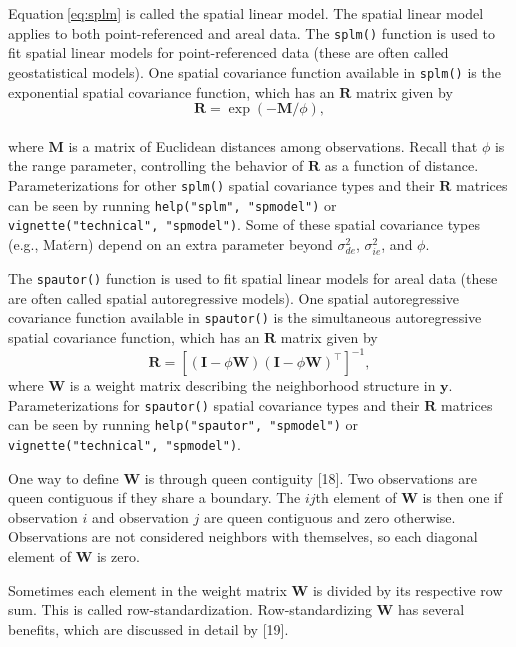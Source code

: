 \documentclass[10pt,letterpaper]{article}
\begin{document}
Equation\(~\)\ref{eq:splm} is called the spatial linear model. The
spatial linear model applies to both point-referenced and areal data.
The \texttt{splm()} function is used to fit spatial linear models for
point-referenced data (these are often called geostatistical models).
One spatial covariance function available in \texttt{splm()} is the
exponential spatial covariance function, which has an \(\mathbf{R}\)
matrix given by \begin{equation*}
  \mathbf{R} = \exp(-\mathbf{M} / \phi),
\end{equation*}\\
where \(\mathbf{M}\) is a matrix of Euclidean distances among
observations. Recall that \(\phi\) is the range parameter, controlling
the behavior of \(\mathbf{R}\) as a function of distance.
Parameterizations for other \texttt{splm()} spatial covariance types and
their \(\mathbf{R}\) matrices can be seen by running
\texttt{help("splm",\ "spmodel")} or
\texttt{vignette("technical",\ "spmodel")}. Some of these spatial
covariance types (e.g., Mat\(\acute{e}\)rn) depend on an extra parameter
beyond \(\sigma^2_{de}\), \(\sigma^2_{ie}\), and \(\phi\).

The \texttt{spautor()} function is used to fit spatial linear models for
areal data (these are often called spatial autoregressive models). One
spatial autoregressive covariance function available in
\texttt{spautor()} is the simultaneous autoregressive spatial covariance
function, which has an \(\mathbf{R}\) matrix given by \begin{equation*}
  \mathbf{R} = [(\mathbf{I} - \phi \mathbf{W})(\mathbf{I} - \phi \mathbf{W})^\top]^{-1},
\end{equation*} where \(\mathbf{W}\) is a weight matrix describing the
neighborhood structure in \(\mathbf{y}\). Parameterizations for
\texttt{spautor()} spatial covariance types and their \(\mathbf{R}\)
matrices can be seen by running \texttt{help("spautor",\ "spmodel")} or
\texttt{vignette("technical",\ "spmodel")}.

One way to define \(\mathbf{W}\) is through queen contiguity {[}18{]}.
Two observations are queen contiguous if they share a boundary. The
\(ij\)th element of \(\mathbf{W}\) is then one if observation \(i\) and
observation \(j\) are queen contiguous and zero otherwise. Observations
are not considered neighbors with themselves, so each diagonal element
of \(\mathbf{W}\) is zero.

Sometimes each element in the weight matrix \(\mathbf{W}\) is divided by
its respective row sum. This is called row-standardization.
Row-standardizing \(\mathbf{W}\) has several benefits, which are
discussed in detail by {[}19{]}.
\end{document}
